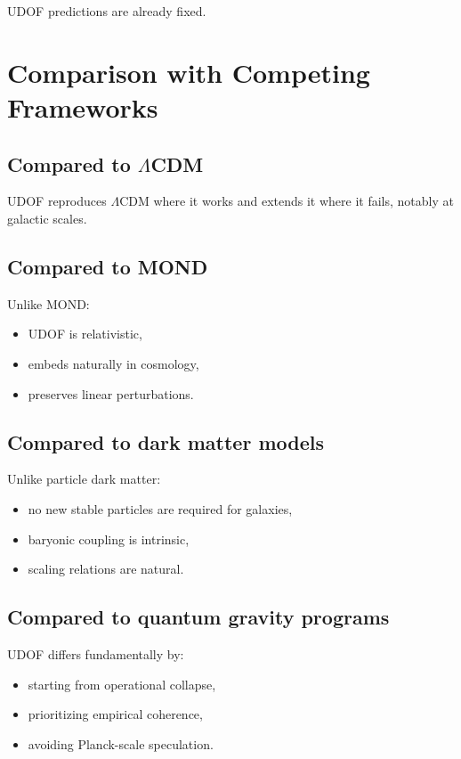\documentclass[11pt]{book}
\begin{document}
UDOF predictions are already fixed.

\chapter{Comparison with Competing Frameworks}

\section{Compared to $\Lambda$CDM}

UDOF reproduces $\Lambda$CDM where it works and extends it where it fails,
notably at galactic scales.

\section{Compared to MOND}

Unlike MOND:
\begin{itemize}
\item UDOF is relativistic,
\item embeds naturally in cosmology,
\item preserves linear perturbations.
\end{itemize}

\section{Compared to dark matter models}

Unlike particle dark matter:
\begin{itemize}
\item no new stable particles are required for galaxies,
\item baryonic coupling is intrinsic,
\item scaling relations are natural.
\end{itemize}

\section{Compared to quantum gravity programs}

UDOF differs fundamentally by:
\begin{itemize}
\item starting from operational collapse,
\item prioritizing empirical coherence,
\item avoiding Planck-scale speculation.
\end{itemize}
\end{document}
